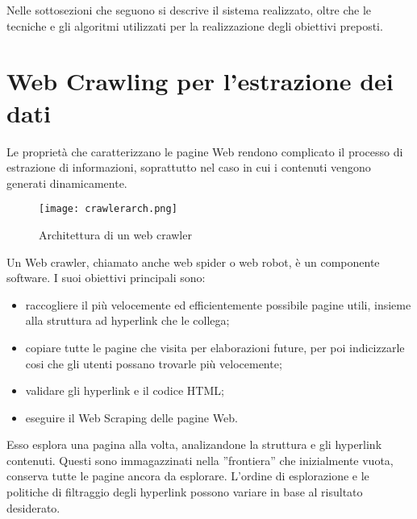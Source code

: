 Nelle sottosezioni che seguono si descrive il sistema realizzato, oltre che le tecniche e gli algoritmi utilizzati per la realizzazione degli obiettivi preposti.

\section{Web Crawling per l'estrazione dei dati}
\label{crawling}
Le proprietà che caratterizzano le pagine Web rendono complicato il processo di estrazione di informazioni, soprattutto nel caso in cui i contenuti vengono generati dinamicamente.

\begin{figure}[htb]
	\centering
	\texttt{[image: crawlerarch.png]}
	\caption{Architettura di un web crawler}
	\label{crawlerarch}
\end{figure}

Un Web crawler, chiamato anche web spider o web robot, è un componente software. I suoi obiettivi principali sono:
\begin{itemize}
\item raccogliere il più velocemente ed efficientemente possibile pagine utili, insieme alla struttura ad hyperlink che le collega;
\item copiare tutte le pagine che visita per elaborazioni future, per poi indicizzarle cosi che gli utenti possano trovarle più velocemente;
\item validare gli hyperlink e il codice HTML;
\item eseguire il Web Scraping delle pagine Web.
\end{itemize}

Esso esplora una pagina alla volta, analizandone la struttura e gli hyperlink contenuti. Questi sono immagazzinati nella ''frontiera'' che inizialmente vuota, conserva tutte le pagine ancora da esplorare. L'ordine di esplorazione e le politiche di filtraggio degli hyperlink possono variare in base al risultato desiderato. 

